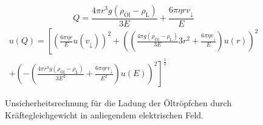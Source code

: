 \begin{figure}[h]
	\begin{equation*}
		Q = \frac{4\pi r^3g(\rho_\text{Öl}-\rho_\text{L})}{3E}+ \frac{6\pi \eta r v_\downarrow}{E}
	\end{equation*}
	\begin{align*}
		u(Q) = \left[ \left( \frac{6\pi \eta r}{E} u(v_\downarrow) \right)^2  + \left( \left( \frac{4\pi g (\rho_\text{Öl} - \rho_\text{L})}{3E} 3 r^2 + \frac{6\pi \eta v_\downarrow}{E} \right) u(r) \right)^2 \right.\\ + \left.\left( - \left( \frac{4\pi r^3 g (\rho_\text{Öl} - \rho_\text{L})} {3E^2} + \frac{6\pi \eta r v_\downarrow}{E^2} \right) u(E) \right)^2  \right]^\frac{1}{2}
	\end{align*}
	\caption{Unsicherheitsrechnung für die Ladung der Öltröpfchen durch Kräftegleichgewicht in anliegendem elektrischen Feld.}
	\label{eq:unc_Q}
\end{figure}
